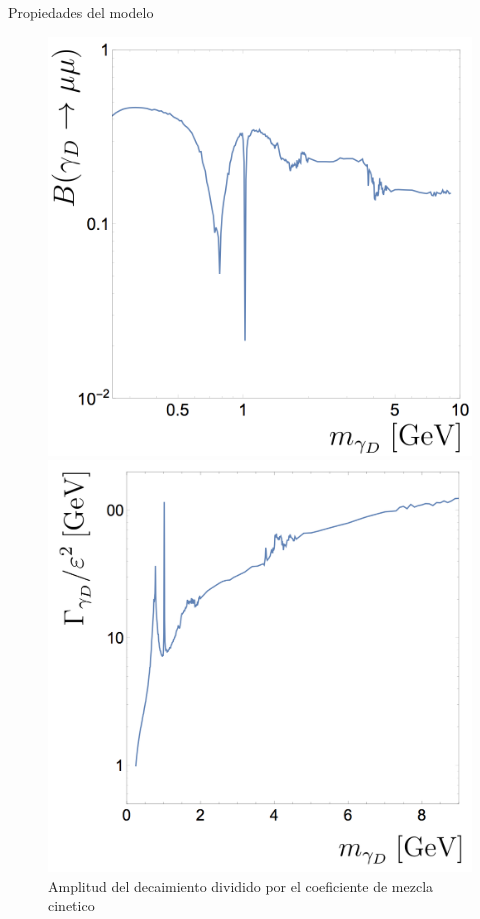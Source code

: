 \begin{frame}{Propiedades del modelo}
\begin{figure}[ht]

\begin{minipage}[b]{0.45\linewidth}
\centering
\includegraphics[width=1\textwidth]{Imag/teoria_dark_photon2.png}
\caption{Probabilidad de decaimiento del fotos oscuro a dos muones}
\end{minipage}
\hspace{0.5cm}
\begin{minipage}[b]{0.45\linewidth}
\centering
\includegraphics[width=1\textwidth]{Imag/teoria_dark_photon1.png}
\caption{Amplitud del decaimiento dividido por el coeficiente de mezcla cinetico}
\end{minipage}
\end{figure}
\end{frame}




